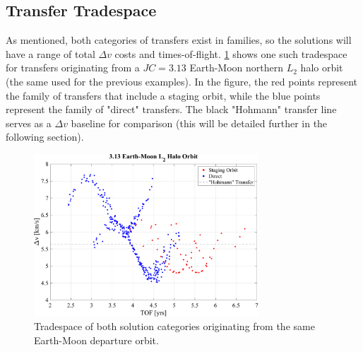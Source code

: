 \subsection{Transfer Tradespace}
As mentioned, both categories of transfers exist in families, so the solutions will have a range of
total $\Delta v$ costs and times-of-flight. \cref{fig:tradespace} shows one such tradespace for
transfers originating from a $JC=3.13$ Earth-Moon northern $L_{2}$ halo orbit (the same used for
the previous examples). In the figure, the red points represent the family of transfers that
include a staging orbit, while the blue points represent the family of "direct" transfers. The
black "Hohmann" transfer line serves as a $\Delta v$ baseline for comparison (this will be detailed
further in the following section). 

\begin{figure}[ht]
    \centering
    \includegraphics[width=0.75\textwidth]{figures/Tradespace.pdf}
    \caption{Tradespace of both solution categories originating from the same Earth-Moon departure orbit.}
    \label{fig:tradespace}
\end{figure}
